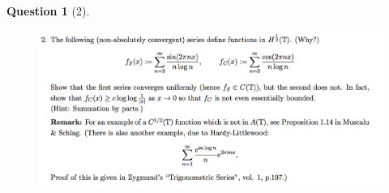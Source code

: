 \documentclass{article} %
\theoremstyle{quest}
\newtheorem*{question}{Question}
\begin{document}
\newpage

\begin{question}[2]
\hfill
\begin{figure}[h!]
  \centering
    \includegraphics[width=1\textwidth]{HA-2-2.png}
\end{figure}
\end{question}
\end{document}

